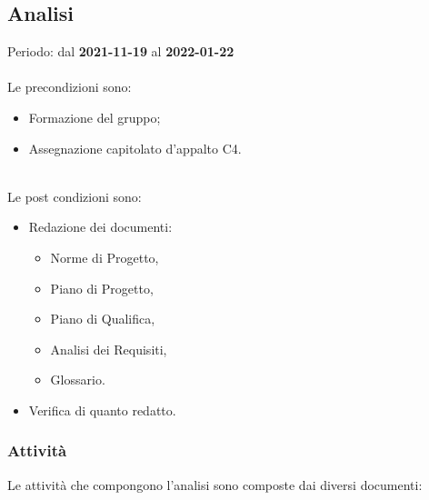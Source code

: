 %

\subsection{Analisi} 

Periodo: dal \textbf{2021-11-19} al \textbf{2022-01-22}  \mbox{} \\ \mbox{} \\
Le precondizioni sono:
\begin{itemize}
\item Formazione del gruppo;
\item Assegnazione capitolato d’appalto C4.
\end{itemize}  \mbox{} \\
Le post condizioni sono:
\begin{itemize}
\item Redazione dei documenti:
\begin{itemize}
	\item Norme di Progetto,
	\item Piano di Progetto,
	\item Piano di Qualifica,
	\item Analisi dei Requisiti,
	\item Glossario.
\end{itemize}
\item Verifica di quanto redatto.
\end{itemize}

\subsubsection{Attività}

Le attività che compongono l’analisi sono composte dai diversi documenti:

